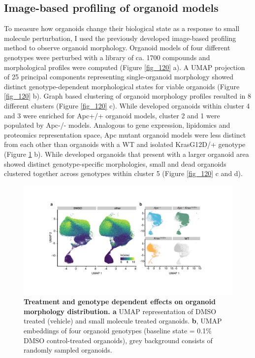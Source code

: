 \begin{flushleft}
\newpage
\section{Image-based profiling of organoid models}

To measure how organoids change their biological state as a response to small molecule perturbation, I used the previously developed image-based profiling method to observe organoid morphology. Organoid models of four different genotypes were perturbed with a library of ca. 1700 compounds and morphological profiles were computed (Figure \ref{fig_120} a). A UMAP projection of 25 principal components representing single-organoid morphology showed distinct genotype-dependent morphological states for viable organoids (Figure \ref{fig_120} b). Graph based clustering of organoid morphology profiles resulted in 8 different clusters (Figure \ref{fig_120} c). While developed organoids within cluster 4 and 3 were enriched for Apc+/+ organoid models, cluster 2 and 1 were populated by Apc-/- models. Analogous to gene expression, lipidomics and proteomics representation space, Apc mutant organoid models were less distinct from each other than organoids with a WT and isolated KrasG12D/+ genotype (Figure \ref{fig_140} b). While developed organoids that present with a larger organoid area showed distinct genotype-specific morphologies, small and dead organoids clustered together across genotypes within cluster 5 (Figure \ref{fig_120} c and d). 

\bigbreak
\begin{figure}[h!]
\centering
\includegraphics[width=\textwidth,
                height=\textheight,
                keepaspectratio]{figures/adenomaprofiling/pdf/fig_1_4.pdf}
\caption{\textbf{Treatment and genotype dependent effects on organoid morphology distribution. a} UMAP representation of DMSO treated (vehicle) and small molecule treated organoids. \textbf{b}, UMAP embeddings of four organoid genotypes (baseline state = 0.1\% DMSO control-treated organoids), grey background consists of randomly sampled organoids.}
\label{fig_140}
\end{figure}


\end{flushleft}
